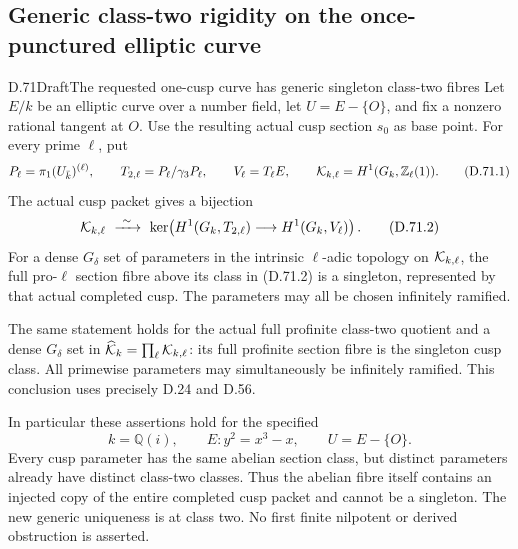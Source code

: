 \subsection{Generic class-two rigidity on the once-punctured elliptic curve}

\begin{statement}{D.71}{Draft}{The requested one-cusp curve has generic singleton class-two fibres}
Let \(E/k\) be an elliptic curve over a number field, let
\(U=E-\{O\}\), and fix a nonzero rational tangent at \(O\).
Use the resulting actual cusp section \(s_0\) as base point.
For every prime \(\ell\), put
\[
 P_\ell=\pi_1(U_{\bar k})^{(\ell)},\qquad
 T_{2,\ell}=P_\ell/\gamma_3P_\ell,\qquad
 V_\ell=T_\ell E,\qquad
 {\cal K}_{k,\ell}=H^1(G_k,\mathbb Z_\ell(1)).
                                                        \tag{D.71.1}
\]
The actual cusp packet gives a bijection
\[
 {\cal K}_{k,\ell}\ \xrightarrow{\ \sim\ }\
 \ker\!\left(H^1(G_k,T_{2,\ell})\longrightarrow
                                  H^1(G_k,V_\ell)\right).
                                                        \tag{D.71.2}
\]
For a dense \(G_\delta\) set of parameters in the intrinsic
\(\ell\)-adic topology on \({\cal K}_{k,\ell}\), the full
pro-\(\ell\) section fibre above its class in (D.71.2)
is a singleton, represented by that actual completed cusp.
The parameters may all be chosen infinitely ramified.

The same statement holds for the actual full profinite
class-two quotient and a dense \(G_\delta\) set in
\(\widehat{\cal K}_k=\prod_\ell{\cal K}_{k,\ell}\):
its full profinite section fibre is the singleton cusp
class. All primewise parameters may simultaneously
be infinitely ramified. This conclusion uses precisely
D.24 and D.56.

In particular these assertions hold for the specified
\[
 k=\mathbb Q(i),\qquad E:y^2=x^3-x,\qquad U=E-\{O\}.
                                                        \tag{D.71.3}
\]
Every cusp parameter has the same abelian section
class, but distinct parameters already have distinct
class-two classes. Thus the abelian fibre itself
contains an injected copy of the entire completed
cusp packet and cannot be a singleton. The new
generic uniqueness is at class two. No first finite
nilpotent or derived obstruction is asserted.
\end{statement}

